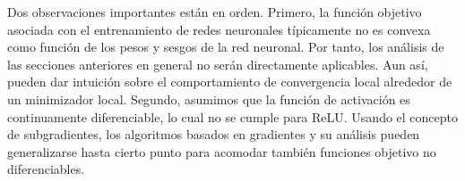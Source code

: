 \documentclass[11pt]{report}
\theoremstyle{definition}
\theoremstyle{plain}
\numberwithin{equation}{section}
\begin{document}
Dos observaciones importantes están en orden. Primero, la función objetivo asociada con el entrenamiento de redes neuronales típicamente no es convexa como función de los pesos y sesgos de la red neuronal. Por tanto, los análisis de las secciones anteriores en general no serán directamente aplicables. Aun así, pueden dar intuición sobre el comportamiento de convergencia local alrededor de un minimizador local. Segundo, asumimos que la función de activación es continuamente diferenciable, lo cual no se cumple para ReLU. Usando el concepto de subgradientes, los algoritmos basados en gradientes y su análisis pueden generalizarse hasta cierto punto para acomodar también funciones objetivo no diferenciables.





\end{document}
